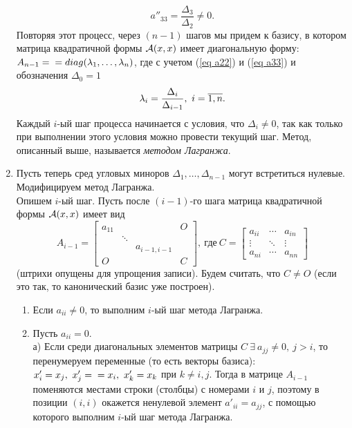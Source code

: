 \begin{proofocre}
\begin{enumerate}
    \begin{equation}
    \label{eq a33}
        a''_{33}=\frac{\Delta_3}{\Delta_2}\neq 0.
    \end{equation}
    Повторяя этот процесс, через $(n-1)$ шагов мы придем к базису, в котором матрица квадратичной формы ${\mathcal{A}}(x,x)$ имеет диагональную форму: $A_{n-1}=\\=diag(\lambda_1,\ldots,\lambda_n)$, где с учетом (\ref{eq a22}) и (\ref{eq a33}) и обозначения $\Delta_0=1$
    \begin{equation}
    \label{eq лямбды у квадр.}
        \lambda_i=\frac{\Delta_i}{\Delta_{i-1}},~i=\overline{1,n}.
    \end{equation}
    Каждый $i$-ый шаг процесса начинается с условия, что $\Delta_i\neq 0$, так как только при выполнении этого условия можно провести текущий шаг. Метод, описанный выше, называется \emph{методом Лагранжа}.
    \item Пусть теперь сред угловых миноров $\Delta_1,\ldots,\Delta_{n-1}$ могут встретиться нулевые. Модифицируем метод Лагранжа.\\
    Опишем $i$-ый шаг. Пусть после $(i-1)$-го шага матрица квадратичной формы ${\mathcal{A}}(x,x)$ имеет вид
    $$A_{i-1}=
    \begin{bmatrix}
        a_{11} & & & O\\
        & \ddots & &\\
        & & a_{i-1,i-1} &\\
        O & & & C
    \end{bmatrix},~\text{где}~C=
    \begin{bmatrix}
        a_{ii} & \cdots & a_{in}\\
        \vdots & \ddots & \vdots\\
        a_{ni} & \cdots & a_{nn}
    \end{bmatrix}$$
    (штрихи опущены для упрощения записи). Будем считать, что $C\neq O$ (если это так, то канонический базис уже построен).
    \begin{enumerate}
        \item Если $a_{ii}\neq 0$, то выполним $i$-ый шаг метода Лагранжа.
        \item Пусть $a_{ii}=0$.\\
        а) Если среди диагональных элементов матрицы $C~\exists~a_{jj}\neq 0,~j>i$, то перенумеруем переменные (то есть векторы базиса): $x'_i=x_j,~x'_j=\\=x_i,~x'_k=x_k$ при $k\neq i,j$. Тогда в матрице $A_{i-1}$ поменяются местами строки (столбцы) с номерами $i$ и $j$, поэтому в позиции $(i,i)$ окажется ненулевой элемент $a'_{ii}=a_{jj}$, с помощью которого выполним $i$-ый шаг метода Лагранжа.\\

\end{enumerate}
\end{enumerate}
\end{proofocre}
